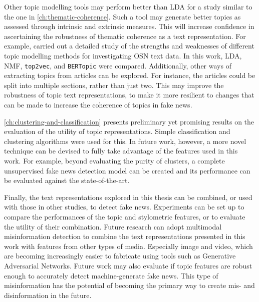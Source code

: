 Other topic modelling tools may perform better than \ac{LDA} for a study similar to the one in \autoref{ch:thematic-coherence}. Such a tool may generate better topics as assessed through intrinsic and extrinsic measures. This will increase confidence in ascertaining the robustness of thematic coherence as a text representation. For example,  carried out a detailed study of the strengths and weaknesses of different topic modelling methods for investigating \ac{OSN} text data. In this work, \ac{LDA}, \ac{NMF}, \texttt{top2vec}, and \texttt{BERTopic} were compared. Additionally, other ways of extracting topics from articles can be explored. For instance, the articles could be split into multiple sections, rather than just two. This may improve the robustness of topic text representations, to make it more resilient to changes that can be made to increase the coherence of topics in fake news.

\autoref{ch:clustering-and-classification} presents preliminary yet promising results on the evaluation of the utility of topic representations. Simple classification and clustering algorithms were used for this. In future work, however, a more novel technique can be devised to fully take advantage of the features used in this work. For example, beyond evaluating the purity of clusters, a complete unsupervised fake news detection model can be created and its performance can be evaluated against the state-of-the-art.

Finally, the text representations explored in this thesis can be combined, or used with those in other studies, to detect fake news. Experiments can be set up to compare the performances of the topic and stylometric features, or to evaluate the utility of their combination. Future research can adopt multimodal misinformation detection to combine the text representations presented in this work with features from other types of media. Especially image and video, which are becoming increasingly easier to fabricate using tools such as Generative Adversarial Networks. Future work may also evaluate if topic features are robust enough to accurately detect machine-generate fake news. This type of misinformation has the potential of becoming the primary way to create mis- and disinformation in the future.

